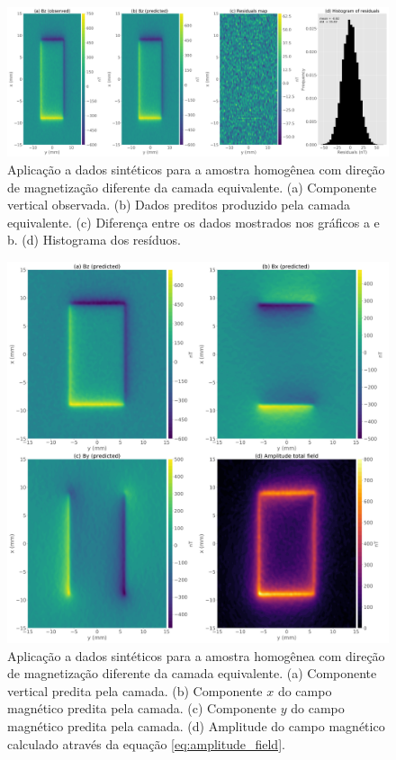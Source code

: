 \begin{figure}
	\centering
	\includegraphics[width=.9\textwidth]{Fig/mag_vec/amostra_homo_errado/results_data_fitting_Bz.png}
	\caption{Aplicação a dados sintéticos para a amostra homogênea com direção de magnetização diferente da camada equivalente. (a) Componente vertical observada. (b) Dados preditos produzido pela camada equivalente. (c) Diferença entre os dados mostrados nos gráficos a e b. (d) Histograma dos resíduos.}
	\label{fig:datafit_homo_sample_difdir}
\end{figure}

\begin{figure}
	\centering
	\includegraphics[width=1.\textwidth]{Fig/mag_vec/amostra_homo_errado/field_components_eqlayer.png}
	\caption{Aplicação a dados sintéticos para a amostra homogênea com direção de magnetização diferente da camada equivalente. (a) Componente vertical predita pela camada. (b) Componente $x$ do campo magnético predita pela camada. (c) Componente $y$ do campo magnético predita pela camada. (d) Amplitude do campo magnético calculado através da equação \ref{eq:amplitude_field}.}
	\label{fig:components_homo_sample_difdir}
\end{figure}

